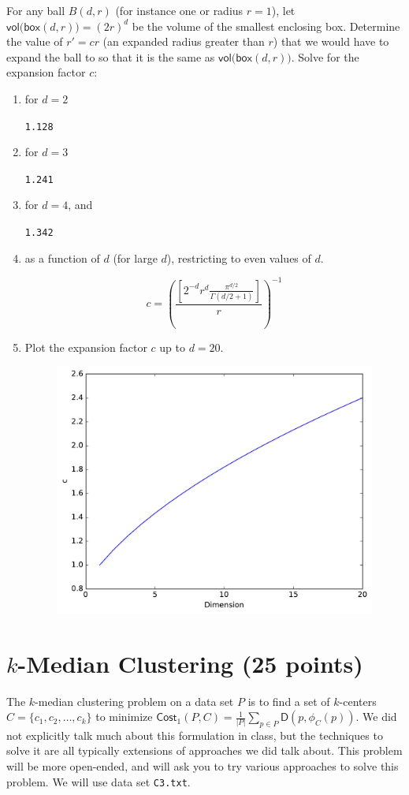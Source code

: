 \documentclass[11pt]{article}
\newcommand{\D}{\textsf{D}}
\begin{document}
For any ball $B(d,r)$ (for instance one or radius $r=1$), let $\mathsf{vol(box}(d,r)) = (2r)^d$ be the volume of the smallest enclosing box.  Determine the value of $r' = c r$ (an expanded radius greater than $r$) that we would have to expand the ball to so that it is the same as $\mathsf{vol(box}(d,r))$.  
Solve for the expansion factor $c$:
\begin{enumerate}
\item for $d=2$

{\tt 1.128}

\item for $d=3$

{\tt 1.241}


\item for $d=4$, and

{\tt 1.342}

\item as a function of $d$ (for large $d$), restricting to even values of $d$.

\[
  c = \left( \frac{\left[2^{-d}r^{d}\frac{\pi^{d/2}}{\Gamma (d/2 + 1)}\right]}{r} \right)^{-1}
\]
  
\item Plot the expansion factor $c$ up to $d=20$.  


\begin{figure}[H]
\centering
\includegraphics[width=.75\textwidth]{high_dimension.pdf}
\end{figure}

\end{enumerate}



\section{$k$-Median Clustering (25 points)}
The $k$-median clustering problem on a data set $P$ is to find a set of $k$-centers $C = \{c_1, c_2, \ldots, c_k\}$ to minimize
$
\textsf{Cost}_1(P,C) = \frac{1}{|P|}\sum_{p \in P} \D(p, \phi_C(p)).
$
We did not explicitly talk much about this formulation in class, but the techniques to solve it are all typically extensions of approaches we did talk about.  This problem will be more open-ended, and will ask you to try various approaches to solve this problem.  We will use data set \texttt{C3.txt}.  
\end{document}
